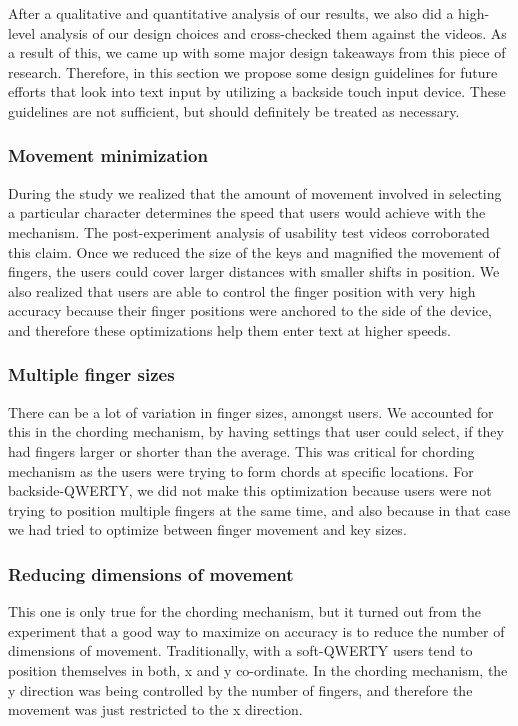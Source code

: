 After a qualitative and quantitative analysis of our results, we also
did a high-level analysis of our design choices and cross-checked them
against the videos. As a result of this, we came up with some major
design takeaways from this piece of research. Therefore, in this
section we propose some design guidelines for future efforts that look
into text input by utilizing a backside touch input device. These
guidelines are not sufficient, but should definitely be treated as
necessary.

\subsubsection{Movement minimization}

During the study we realized that the amount of movement involved in
selecting a particular character determines the speed that users would
achieve with the mechanism. The post-experiment analysis of usability
test videos corroborated this claim. Once we reduced the size of the
keys and magnified the movement of fingers, the users could cover
larger distances with smaller shifts in position. We also realized
that users are able to control the finger position with very high
accuracy because their finger positions were anchored to the side of the device, and therefore these optimizations help them enter text at higher speeds.

\subsubsection{Multiple finger sizes}

There can be a lot of variation in finger sizes, amongst users. We
accounted for this in the chording mechanism, by having settings that
user could select, if they had fingers larger or shorter than the
average. This was critical for chording mechanism as the users were
trying to form chords at specific locations. For backside-QWERTY, we
did not make this optimization because users were not trying to
position multiple fingers at the same time, and also because in that
case we had tried to optimize between finger movement and key
sizes.

\subsubsection{Reducing dimensions of movement}

This one is only true for the chording mechanism, but it turned out
from the experiment that a good way to maximize on accuracy is to
reduce the number of dimensions of movement. Traditionally, with a
soft-QWERTY users tend to position themselves in both, x and y
co-ordinate. In the chording mechanism, the y direction was being
controlled by the number of fingers, and therefore the movement was
just restricted to the x direction.

